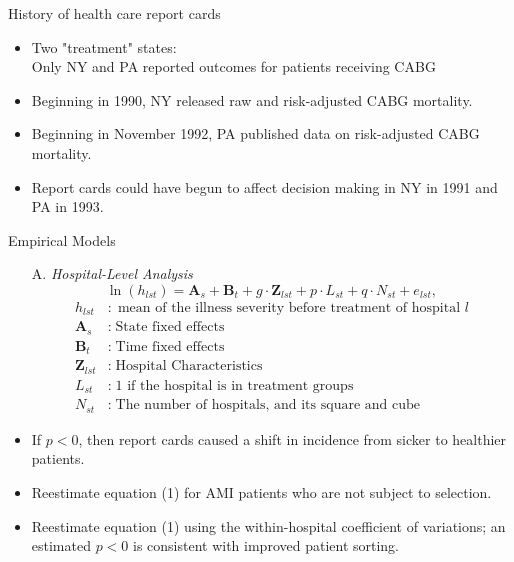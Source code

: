 \documentclass[10pt]{beamer}
\begin{document}
\begin{frame}{History of health care report cards}

\begin{itemize}
\item Two "treatment" states: \\Only NY and PA reported outcomes for patients receiving CABG
\item Beginning in 1990, NY released raw and risk-adjusted CABG mortality.
\item Beginning in November 1992, PA published data on risk-adjusted CABG mortality.
\item Report cards could have begun to affect decision making in NY in 1991 and PA in 1993.
\end{itemize}

\end{frame}

\begin{frame}{Empirical Models}
\begin{itemize}
\item[A.] \textit{Hospital-Level Analysis}
\begin{equation}
\ln \left(h_{l s t}\right)=\mathbf{A}_s+\mathbf{B}_t+g \cdot \mathbf{Z}_{l s t}+p \cdot L_{s t}+q \cdot N_{s t}+e_{l s t},
\end{equation}
             \begin{align*}
                h_{lst}&: \; \text{mean of the illness severity before treatment of hospital $l$}\\
                \mathbf{A}_s&: \; \text{State fixed effects}\\
                \mathbf{B}_t&: \; \text{Time fixed effects}\\
                \mathbf{Z}_{lst}&: \; \text{Hospital Characteristics}\\
                L_{st}&: \; \text{1 if the hospital is in treatment groups}\\
                N_{st}&: \; \text{The number of hospitals, and its square and cube}
            \end{align*}
\item If $p<0$, then report cards caused a shift in incidence from sicker to healthier patients.
\item Reestimate equation (1) for AMI patients who are not subject to selection.
\item Reestimate equation (1) using the within-hospital coefficient of variations; an estimated $p<0$ is consistent with improved patient sorting.
\end{itemize}

\end{frame}
\end{document}

